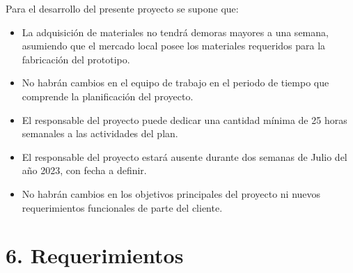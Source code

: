 \documentclass[
11pt, %
codirector, %
]{charter}
\begin{document}
Para el desarrollo del presente proyecto se supone que:

\begin{itemize}
	\item La adquisición de materiales no tendrá demoras mayores a una semana, asumiendo que el mercado local posee los materiales requeridos para la fabricación del prototipo.
	\item No habrán cambios en el equipo de trabajo en el periodo de tiempo que comprende la planificación del proyecto.
	\item El responsable del proyecto puede dedicar una cantidad mínima de 25 horas semanales a las actividades del plan.
	\item El responsable del proyecto estará ausente durante dos semanas de Julio del año 2023, con fecha a definir.
	\item No habrán cambios en los objetivos principales del proyecto ni nuevos requerimientos funcionales de parte del cliente.
\end{itemize}

\section{6. Requerimientos}
\label{sec:requerimientos}


\end{document}
